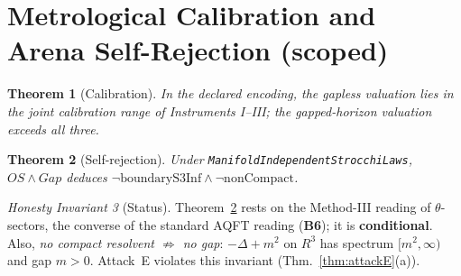 \documentclass[11pt,a4paper]{article}
\def\R{R}\def\N{N}\def\Q{Q}\def\Z{Z}\def\Class{C}\def\OS{OS}\def\Gap{Gap}%
\theoremstyle{plain}
\newtheorem{theorem}{Theorem}[section]
\theoremstyle{definition}
\theoremstyle{remark}
\newtheorem{invariant}[theorem]{Honesty Invariant}
\newcommand{\R}{\mathbb{R}}\newcommand{\N}{\mathbb{N}}\newcommand{\Q}{\mathbb{Q}}
\newcommand{\Z}{\mathbb{Z}}\newcommand{\Spec}{\operatorname{Spec}}
\newcommand{\OS}{\mathrm{OS}}\newcommand{\Gap}{\mathrm{Gap}}
\newcommand{\Class}{\mathcal{C}}\newcommand{\Htot}{\mathcal{H}}
\renewcommand{\_}{\oldunderscore\allowbreak}
\newcommand{\Lean}[1]{\texttt{\small #1}}
\begin{document}
\section{Metrological Calibration and Arena Self-Rejection (scoped)}
\begin{theorem}[Calibration]\label{thm:calib}
In the declared encoding, the gapless valuation lies in the joint calibration range of
Instruments I--III; the gapped-horizon valuation exceeds all three.
\end{theorem}
\begin{theorem}[Self-rejection]\label{thm:selfrej}
Under \Lean{ManifoldIndependentStrocchiLaws}, $\OS\wedge\Gap$ deduces
$\neg\mathrm{boundaryS3Inf}\wedge\neg\mathrm{nonCompact}$.
\end{theorem}
\begin{invariant}[Status]\label{inv:metrology}
Theorem~\ref{thm:selfrej} rests on the Method-III reading of $\theta$-sectors, the converse of the
standard AQFT reading (\textbf{B6}); it is \textbf{conditional}. Also, \emph{no compact resolvent
$\not\Rightarrow$ no gap}: $-\Delta+m^2$ on $\R^3$ has spectrum $[m^2,\infty)$ and gap $m>0$.
Attack~E violates this invariant (Thm.~\ref{thm:attackE}(a)).
\end{invariant}
\end{document}
